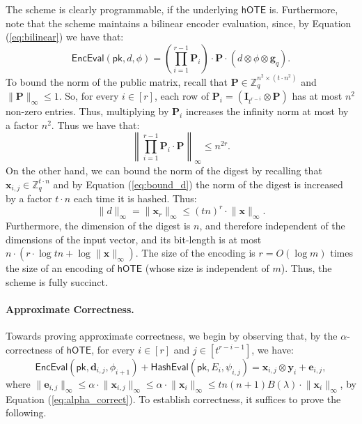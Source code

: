 \documentclass{theoretics}
\newcommand{\BOTE}{\mathsf{hOTE}}
\newcommand{\Z}{\mathbb{Z}}
\renewcommand{\sec}{\ensuremath{\lambda}}
\newcommand{\algofont}[1]{\ensuremath{\mathsf{#1}}}
\newcommand{\Enc}{{\algofont{Enc}}}
\newcommand{\Eval}{\algofont{Eval}\xspace}
\newcommand{\Hash}{{\algofont{Hash}}}
\newcommand{\id}{\ensuremath{\mathbf{I}}}
\newcommand{\pk}{{\mathsf{pk}}}
\begin{document}
The scheme is clearly programmable, if the underlying $\BOTE$ is.
Furthermore, note that the scheme maintains a bilinear encoder evaluation, since, by Equation (\ref{eq:bilinear}) we have that:
\begin{equation}\label{eq:bilinear2}
    \Enc\Eval(\pk, d, \phi)=\left(\prod_{i=1}^{r-1}\mathbf{P}_i\right)\cdot \mathbf{P} \cdot (d\otimes \phi\otimes \mathbf{g}_q).
\end{equation}
To bound the norm of the public matrix, recall that  $\mathbf{P}\in\Z_q^{n^2\times (t\cdot n^2)}$ and $\lVert \mathbf{P}\rVert_\infty\le 1$. 
So, for every $i\in[r]$, each row of $\mathbf{P}_i=(\id_{t^{r-i}}\otimes \mathbf{P})$ has at most $n^2$ non-zero entries. Thus, multiplying by $\mathbf{P}_i$ increases the infinity norm at most by a factor $n^2$. Thus we have that:
\begin{equation}\label{eq:matrix_norm2}
    \left\lVert \prod_{i=1}^{r-1}\mathbf{P}_i \cdot \mathbf{P} \right\rVert_\infty \leq n^{2r}.
\end{equation}
On the other hand, we can bound the norm of the digest by recalling that $\mathbf{x}_{i,j}\in\Z_{q}^{t\cdot n}$ and by Equation (\ref{eq:bound_d}) the norm of the digest is increased by a factor $t\cdot n$ each time it is hashed. Thus:
\begin{equation}\label{eq:bound_d2}
    \lVert d\rVert_\infty = \lVert \mathbf{x}_r\rVert_\infty\leq (tn)^r\cdot \lVert \mathbf{x}\rVert_\infty.
\end{equation}
Furthermore, the dimension of the digest is $n$, and therefore independent of the dimensions of the input vector, and its bit-length is at most $n\cdot (r \cdot \log tn +\log  \lVert \mathbf{x}\rVert_\infty)$. The size of the encoding is $r=O(\log m)$ times the size of an encoding of $\BOTE$ (whose size is independent of $m$). Thus, the scheme is fully succinct.

\paragraph{Approximate Correctness.} Towards proving approximate correctness, we begin by observing that, by the $\alpha$-correctness of  $\BOTE$, for every $i\in[r]$ and $j\in[t^{r-i-1}]$, we have:
\begin{equation}\label{basic}
\Enc\Eval(\pk, \mathbf{d}_{i,j}, \phi_{i+1})+\Hash\Eval(\pk, E_i, \psi_{i,j})=\mathbf{x}_{i,j}\otimes \mathbf{y}_i+\mathbf{e}_{i,j},
\end{equation}
where $\lVert \mathbf{e}_{i,j}\rVert_\infty\le \alpha\cdot \lVert \mathbf{x}_{i,j}\rVert_\infty \le \alpha\cdot \lVert \mathbf{x}_i\rVert_\infty \leq tn(n+1) B(\sec)\cdot \lVert \mathbf{x}_i\rVert_\infty$, by Equation (\ref{eq:alpha_correct}). To establish correctness, it suffices to prove the following.
\end{document}
